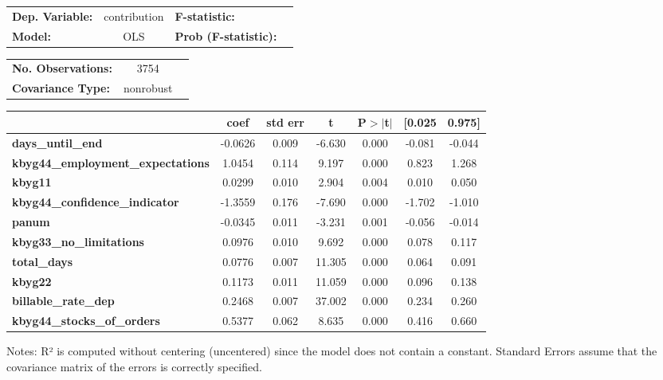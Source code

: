 \begin{center}
\begin{tabular}{lclc}
\centering \toprule
\textbf{Dep. Variable:}                   &  contribution & \textbf{  F-statistic:       }  \\
\textbf{Model:}                           &      OLS      & \textbf{  Prob (F-statistic):}  \\
\bottomrule
\end{tabular}
\begin{tabular}{lcl}
\textbf{No. Observations:}                &       3754    & \textbf{                     }  \\
\textbf{Covariance Type:}                 &   nonrobust   & \textbf{                     }  \\
\bottomrule
\end{tabular}
\begin{tabular}{lcccccc}
                                          & \textbf{coef} & \textbf{std err} & \textbf{t} & \textbf{P$> |$t$|$} & \textbf{[0.025} & \textbf{0.975]}  \\
\midrule
\textbf{days\_until\_end}                 &      -0.0626  &        0.009     &    -6.630  &         0.000        &       -0.081    &       -0.044     \\
\textbf{kbyg44\_employment\_expectations} &       1.0454  &        0.114     &     9.197  &         0.000        &        0.823    &        1.268     \\
\textbf{kbyg11}                           &       0.0299  &        0.010     &     2.904  &         0.004        &        0.010    &        0.050     \\
\textbf{kbyg44\_confidence\_indicator}    &      -1.3559  &        0.176     &    -7.690  &         0.000        &       -1.702    &       -1.010     \\
\textbf{panum}                            &      -0.0345  &        0.011     &    -3.231  &         0.001        &       -0.056    &       -0.014     \\
\textbf{kbyg33\_no\_limitations}          &       0.0976  &        0.010     &     9.692  &         0.000        &        0.078    &        0.117     \\
\textbf{total\_days}                      &       0.0776  &        0.007     &    11.305  &         0.000        &        0.064    &        0.091     \\
\textbf{kbyg22}                           &       0.1173  &        0.011     &    11.059  &         0.000        &        0.096    &        0.138     \\
\textbf{billable\_rate\_dep}              &       0.2468  &        0.007     &    37.002  &         0.000        &        0.234    &        0.260     \\
\textbf{kbyg44\_stocks\_of\_orders}       &       0.5377  &        0.062     &     8.635  &         0.000        &        0.416    &        0.660     \\
\bottomrule
\end{tabular}
\end{center}

Notes: \newline
 [1] R² is computed without centering (uncentered) since the model does not contain a constant. \newline
 [2] Standard Errors assume that the covariance matrix of the errors is correctly specified.